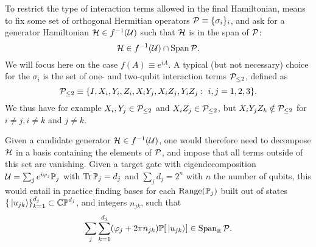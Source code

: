 To restrict the type of interaction terms allowed in the final Hamiltonian, means to fix some set of orthogonal Hermitian operators ${\mathcal{P}}\equiv\{\sigma_i\}_i$, and ask for a generator Hamiltonian ${\mathcal{H}}\in f^{-1}({\mathcal{U}})$ such that ${\mathcal{H}}$ is in the span of ${\mathcal{P}}$:
\begin{equation}
    {\mathcal{H}} \in f^{-1}({\mathcal{U}}) \cap \operatorname{Span}{\mathcal{P}}.
\end{equation}
We will focus here on the case  $f(A)\equiv e^{iA}$. 
A typical (but not necessary) choice for the $\sigma_i$ is the set of one- and two-qubit interaction terms ${\mathcal{P}}_{\le2}$, defined as
\begin{equation}
    {\mathcal{P}}_{\le2} \equiv \{ I, X_i,Y_i,Z_i, X_i Y_j, X_i Z_j, Y_i Z_j : \,\,i,j=1,2,3 \}.
\end{equation}
We thus have for example $X_i,Y_j\in{\mathcal{P}}_{\le2}$ and $X_i Z_j\in{\mathcal{P}}_{\le2}$, but $X_i Y_j Z_k\notin{\mathcal{P}}_{\le2}$ for $i\neq j,i\neq k$ and $j\neq k$.

Given a candidate generator ${\mathcal{H}}\in f^{-1}({\mathcal{U}})$, one would therefore need to decompose ${\mathcal{H}}$ in a basis containing the elements of ${\mathcal{P}}$, and impose that all terms outside of this set are vanishing.
Given a target gate with eigendecomposition
${\mathcal{U}}=\sum_j e^{i\varphi_j}\mathbb{P}_j$ with $\Tr\mathbb{P}_j=d_j$ and $\sum_j d_j=2^n$ with $n$ the number of qubits, this would entail in practice finding bases for each $\operatorname{Range}(\mathbb{P}_j)$ built out of states $\{\ket*{u_{jk}}\}_{k=1}^{d_j}\subset \mathbb{CP}^{d_j}$, and integers $n_{jk}$, such that
\begin{equation}
    \sum_j\sum_{k=1}^{d_j} (\varphi_j + 2\pi n_{jk}) \mathbb{P}[\ket*{u_{jk}}]
    \in \operatorname{Span}_{\mathbb{R}}{\mathcal{P}}.
\end{equation}

